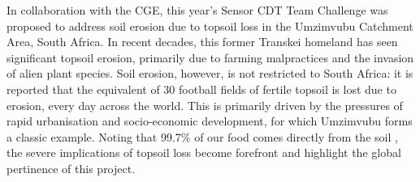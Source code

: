 In collaboration with the \gls{CGE}, this year’s Sensor CDT Team Challenge was proposed to address soil erosion due to topsoil loss in the Umzimvubu Catchment Area, South Africa. 
In recent decades, this former Transkei homeland has seen significant topsoil erosion, primarily due to farming malpractices and the invasion of alien plant species. Soil erosion, however, is not restricted to South Africa: it is reported that the equivalent of 30 football fields of fertile topsoil is lost due to erosion, every day across the world. \cite{saveoursoils} This is primarily driven by the pressures of rapid urbanisation and socio-economic development, for which Umzimvubu forms a classic example. Noting that 99.7$\%$ of our food comes directly from the soil \cite{saveoursoils}, the severe implications of topsoil loss become forefront and highlight the global pertinence of this project. 

